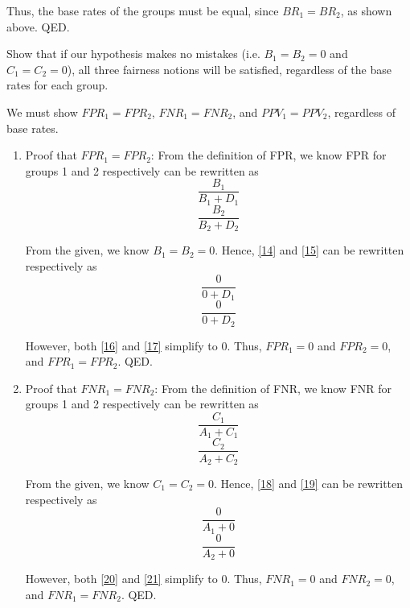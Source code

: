 \documentclass{cisXXX} %
\begin{document}
Thus, the base rates of the groups must be equal, since $BR_1 = BR_2$, as shown above. QED.

\HWproblem
Show that if our hypothesis makes no mistakes (i.e. $B_1 = B_2 = 0$ and $C_1 = C_2 = 0$), all three fairness notions will be satisfied, regardless of the base rates for each group.

We must show $FPR_1 = FPR_2$, $FNR_1 = FNR_2$, and $PPV_1 = PPV_2$, regardless of base rates.

\begin{enumerate}
\item Proof that $FPR_1 = FPR_2$:
From the definition of FPR, we know FPR for groups 1 and 2 respectively can be rewritten as
\begin{equation}
\label{14} \frac{B_1}{B_1 + D_1}
\end{equation}
\begin{equation}
\label{15} \frac{B_2}{B_2 + D_2}
\end{equation}

From the given, we know $B_1 = B_2 = 0$. Hence, \eqref{14} and \eqref{15} can be rewritten respectively as
\begin{equation}
\label{16} \frac{0}{0 + D_1}
\end{equation}
\begin{equation}
\label{17} \frac{0}{0 + D_2}
\end{equation}

However, both \eqref{16} and \eqref{17} simplify to $0$. Thus, $FPR_1 = 0$ and $FPR_2 = 0$, and $FPR_1 = FPR_2$. QED.

\item Proof that $FNR_1 = FNR_2$:
From the definition of FNR, we know FNR for groups 1 and 2 respectively can be rewritten as
\begin{equation}
\label{18} \frac{C_1}{A_1 + C_1}
\end{equation}
\begin{equation}
\label{19} \frac{C_2}{A_2 + C_2}
\end{equation}

From the given, we know $C_1 = C_2 = 0$. Hence, \eqref{18} and \eqref{19} can be rewritten respectively as
\begin{equation}
\label{20} \frac{0}{A_1 + 0}
\end{equation}
\begin{equation}
\label{21} \frac{0}{A_2 + 0}
\end{equation}

However, both \eqref{20} and \eqref{21} simplify to $0$. Thus, $FNR_1 = 0$ and $FNR_2 = 0$, and $FNR_1 = FNR_2$. QED.


\end{enumerate}
\end{document}
